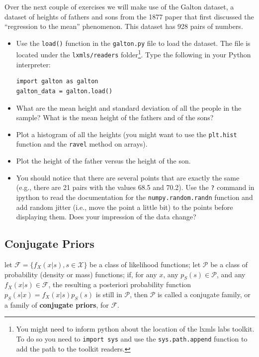 \begin{exercise}
Over the next couple of exercises we will make use of the Galton dataset, a dataset of heights of fathers and sons from the 1877 paper that first discussed the ``regression to the mean'' phenomenon. This dataset has 928 pairs of numbers.
\begin{itemize}
\item Use the \texttt{load()} function in the \texttt{galton.py} file to load the dataset. 
The file is located under the \texttt{lxmls/readers} folder\footnote{
You might need to inform python about the location of the lxmls labs toolkit.
To do so you need to \texttt{import sys} and use the \texttt{sys.path.append} function to add the path to the toolkit readers.}. 
Type the following in your Python interpreter:
\begin{verbatim}
import galton as galton
galton_data = galton.load()
\end{verbatim}
\item What are the mean height and standard deviation of all the people in the sample? What is the mean height of the fathers and of the sons?
\item Plot a histogram of all the heights (you might want to use the \texttt{plt.hist} function and the \texttt{ravel} method on arrays).
\item Plot the height of the father versus the height of the son.
\item You should notice that there are several points that are exactly the same (e.g., there are 21 pairs with the values 68.5 and 70.2). Use the \texttt{?} command in ipython to read the documentation for the \texttt{numpy.random.randn} function and add random jitter (i.e., move the point a little bit) to the points before displaying them. Does your impression of the data change?
\end{itemize}
\end{exercise}

\subsection{Conjugate Priors}
\begin{definition}
let $\mathcal{F}= \{f_{X}(x|s), s \in \mathcal{X}\}$ be a class of likelihood functions; let $\mathcal{P}$ be a class of probability (density or mass) functions; if, for any $x$, any $p_{S}(s) \in \mathcal{P}$, and any $f_{X}(x|s) \in \mathcal{F}$, the resulting a posteriori probability function $p_{S}(s|x) = f_{X}(x|s)p_{S}(s)$ is still in $\mathcal{P}$, then $\mathcal{P}$ is called a conjugate family, or a family of {\bf conjugate priors}, for $\mathcal{F}$.
\end{definition}
